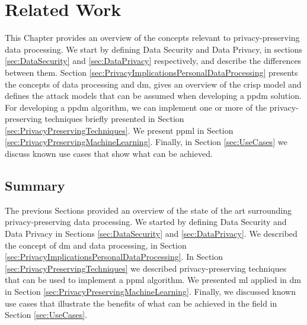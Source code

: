%

\acresetall

\chapter{Related Work}
\label{ch:RelatedWork}


This Chapter provides an overview of the concepts relevant to privacy-preserving data processing.
We start by defining Data Security and Data Privacy, in sections \ref{sec:DataSecurity} and \ref{sec:DataPrivacy} respectively, and describe the differences between them.
Section \ref{sec:PrivacyImplicationsPersonalDataProcessing} presents the concepts of data processing and \ac{dm}, gives an overview of the \ac{crisp} model and defines the attack models that can be assumed when developing a \ac{ppdm} solution.
For developing a \ac{ppdm} algorithm, we can implement one or more of the privacy-preserving techniques briefly presented in Section \ref{sec:PrivacyPreservingTechniques}. 
We present \ac{ppml} in Section \ref{sec:PrivacyPreservingMachineLearning}. Finally, in Section \ref{sec:UseCases} we discuss known use cases that show what can be achieved.









\section{Summary}
\label{sec:SummaryRelatedWork}

The previous Sections provided an overview of the state of the art surrounding privacy-preserving data processing.
We started by defining Data Security and Data Privacy in Sections \ref{sec:DataSecurity} and \ref{sec:DataPrivacy}.
We described the concept of \ac{dm} and data processing, in Section \ref{sec:PrivacyImplicationsPersonalDataProcessing}.
In Section \ref{sec:PrivacyPreservingTechniques} we described privacy-preserving techniques that can be used to implement a \ac{ppml} algorithm.
We presented \ac{ml} applied in \ac{dm} in Section \ref{sec:PrivacyPreservingMachineLearning}. Finally, we discussed known use cases that illustrate the benefits of what can be achieved in the field in Section \ref{sec:UseCases}.


